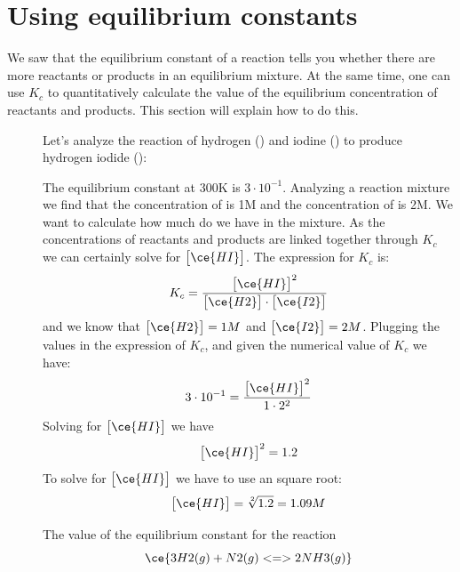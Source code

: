 \documentclass[main.tex]{subfiles}
\begin{document}
\section{ {Using equilibrium constants}}
We saw that the equilibrium constant of a reaction tells you whether there are more reactants or products in an equilibrium mixture. At the same time, one can use $K_c$ to quantitatively calculate the value of the equilibrium concentration of reactants and products. This section will explain how to do this.
\sloppy
\begin{description}
\item[] Let's analyze the reaction of hydrogen () and iodine () to produce hydrogen iodide ():
\begin{center}\end{center}
The equilibrium constant at 300K is $3\cdot 10^{-1}$. Analyzing a reaction mixture we find that the concentration of  is 1M and the concentration of  is 2M. We want to calculate how much  do we have in the mixture. As the concentrations of reactants and products are linked together through $K_c$ we can certainly solve for $\big[ \ce{HI} \big]$. The expression for $K_c$ is:
\begin{equation*}  K_{c}=\frac{\big[ \ce{HI} \big]^2 } {\big[ \ce{H2} \big] \cdot \big[ \ce{I2} \big]}\end{equation*} 
and we know that $\big[ \ce{H2} \big]=1M$ and $\big[ \ce{I2} \big]=2M$. Plugging the values in the expression of $K_c$, and given the numerical value of $K_c$ we have:
\begin{equation*} 3\cdot 10^{-1}=\frac{\big[ \ce{HI} \big]^2 } {1 \cdot 2^2}\end{equation*} 
Solving for $\big[ \ce{HI} \big]$ we have 
\begin{equation*} \big[ \ce{HI} \big]^2=1.2     \end{equation*} 
To solve for $\big[ \ce{HI} \big]$ we have to use an square root:
\begin{equation*} \big[ \ce{HI} \big]=\sqrt[2]{1.2}=1.09M     \end{equation*} 
\begin{example} %
The value of the equilibrium constant for the reaction 
 \begin{equation*} \ce{3H2(g) + N2(g) <=>  2NH3(g)} \end{equation*}

\end{example}
\end{description}
\end{document}
